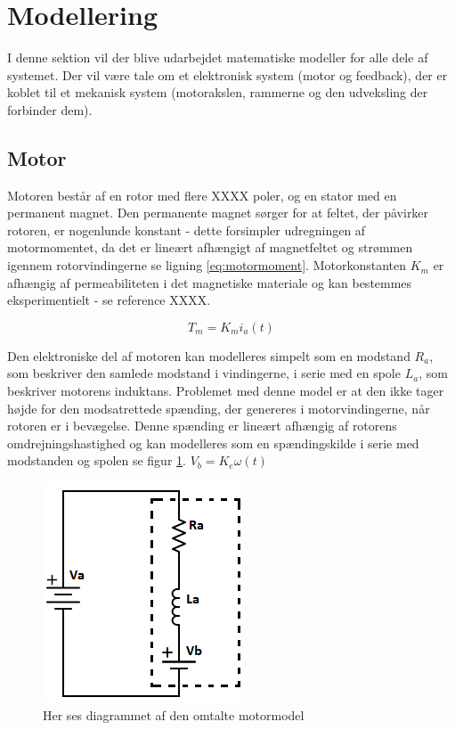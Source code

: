 \section{Modellering}
I denne sektion vil der blive udarbejdet matematiske modeller for alle dele af systemet. Der vil være tale om et elektronisk system (motor og feedback), der er koblet til et mekanisk system (motorakslen, rammerne og den udveksling der forbinder dem). 

\subsection{Motor}
Motoren består af en rotor med flere XXXX poler, og en stator med en permanent magnet. Den permanente magnet sørger for at feltet, der påvirker rotoren, er nogenlunde konstant - dette forsimpler udregningen af motormomentet, da det er lineært afhængigt af magnetfeltet og strømmen igennem rotorvindingerne se ligning \ref{eq:motormoment}. Motorkonstanten $K_{m}$ er afhængig af permeabiliteten i det magnetiske materiale og kan bestemmes eksperimentielt - se reference \cite{azevedoAmerico2013} XXXX.

\begin{equation}\label{eq:motormoment}
T_{m}=K_{m}i_{a}(t)
\end{equation}

Den elektroniske del af motoren kan modelleres simpelt som en modstand $R_{a}$, som beskriver den samlede modstand i vindingerne, i serie med en spole $L_{a}$, som beskriver motorens induktans. Problemet med denne model er at den ikke tager højde for den modsatrettede spænding, der genereres i motorvindingerne, når rotoren er i bevægelse. Denne spænding er lineært afhængig af rotorens omdrejningshastighed og kan modelleres som en spændingskilde i serie med modstanden og spolen se figur \ref{fig:motor_sch}. $V_{b}=K_{e}\omega(t)$

\begin{figure}
\vspace{-20pt}
	\begin{center}
	\includegraphics[scale=0.9]{Billeder/Motormodel.png}
	\end{center}
	\vspace{-10pt}
	\caption{Her ses diagrammet af den omtalte motormodel}
	\label{fig:motor_sch}
\vspace{-20pt}
\end{figure}

